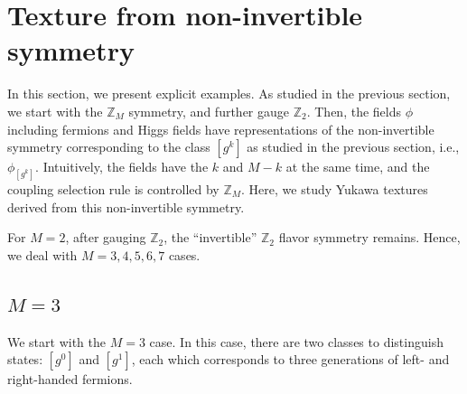 \documentclass[a4paper,11pt]{article}
\numberwithin{equation}{section}
\begin{document}
\section{Texture from non-invertible symmetry}
\label{sec:texture}


In this section, we present explicit examples. 
As studied in the previous section, we start with the $\mathbb{Z}_M$ symmetry, and further gauge $\mathbb{Z}_2$. 
Then, the fields $\phi$ including fermions and Higgs fields have representations of the non-invertible symmetry corresponding to the class $[g^k]$ as studied in the previous section, i.e., $\phi_{[g^k]}$.
Intuitively, the fields have 
the $k$ and $M-k$ at the same time, and the coupling selection rule is controlled by 
$\mathbb{Z}_M$.
Here, we study Yukawa textures derived from this non-invertible symmetry.

For $M=2$, after gauging $\mathbb{Z}_2$, 
the ``invertible'' $\mathbb{Z}_2$ flavor symmetry remains.
Hence, we deal with $M=3,4,5,6,7$ cases. 


\subsection{$M=3$}

We start with the $M=3$ case. 
In this case, there are two classes to distinguish states: $[g^0]$ and $[g^1]$, each which corresponds to three generations of left- and right-handed fermions.  
\end{document}
